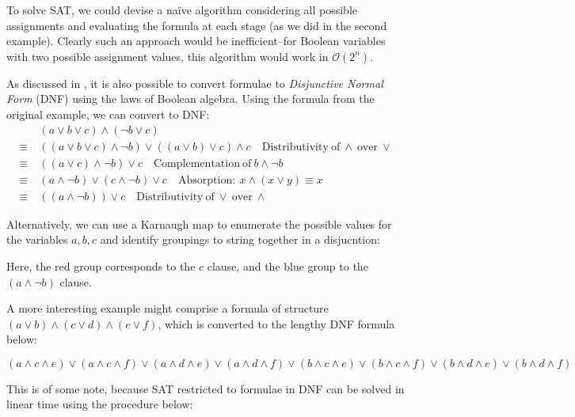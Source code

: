\documentclass[a4paper,openany,12pt]{book}
\begin{document}
To solve SAT, we could devise a naïve algorithm considering all possible assignments and evaluating the formula at each
stage (as we did in the second example).
Clearly such an approach would be inefficient--for Boolean variables with two possible assignment values, this algorithm
would work in $\mathcal{O}(2^n)$.

As discussed in \citet{miltersen2005converting}, it is also possible to convert formulae to \emph{Disjunctive Normal
Form} (DNF) using the laws of Boolean algebra.
Using the formula from the original example, we can convert to DNF:
\begin{align*} & (a \lor b \lor c) \land (\neg b \lor c) \\
   \equiv~ & ((a \lor b \lor c) \land \neg b) \lor ((a \lor b) \lor c) \land c\quad \mathrm{Distributivity~of}~\land~\mathrm{over}~\lor \\
   \equiv~  & ((a \lor c) \land \neg b) \lor c\quad  \mathrm{Complementation~of}~b \land \neg b \\
   \equiv~  & (a \land \neg b) \lor (c \land \neg b) \lor c\quad \mathrm{Absorption:}~x \land (x \lor y) \equiv x \\
   \equiv~  & ((a \land \neg b)) \lor c\quad  \mathrm{Distributivity~of}~\lor~\mathrm{over}~\land
\end{align*}

Alternatively, we can use a Karnaugh map to enumerate the possible values for the variables $a, b, c$ and identify
groupings to string together in a disjucntion:

\begin{Karnaughvuit}
\end{Karnaughvuit}

Here, the red group corresponds to the $c$ clause, and the blue group to the $(a \land \neg b)$ clause.

    A more interesting example might comprise a formula of structure  \(
    (a \lor b) \land (c \lor d) \land (e \lor f)
    \), which is converted to the lengthy DNF formula below:
    
    \[
    (a \land c \land e) \lor (a \land c \land f) \lor (a \land d \land e) \lor (a \land d \land 
    f) \lor (b \land c \land e) \lor (b \land c \land f) \lor (b \land d \land e) \lor (b \land d \land
    f)
    \]
    \vspace{0.25em}

This is of some note, because SAT restricted to formulae in DNF can be solved in linear time using the procedure below:
\end{document}
